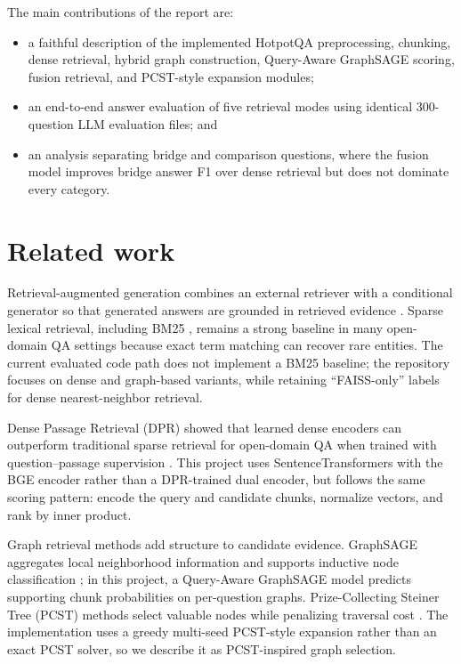 \documentclass{article}
\begin{document}
The main contributions of the report are:
\begin{itemize}
  \item a faithful description of the implemented HotpotQA preprocessing, chunking, dense retrieval, hybrid graph construction, Query-Aware GraphSAGE scoring, fusion retrieval, and PCST-style expansion modules;
  \item an end-to-end answer evaluation of five retrieval modes using identical 300-question LLM evaluation files; and
  \item an analysis separating bridge and comparison questions, where the fusion model improves bridge answer F1 over dense retrieval but does not dominate every category.
\end{itemize}

\section{Related work}

Retrieval-augmented generation combines an external retriever with a conditional generator so that generated answers are grounded in retrieved evidence \citep{lewis2020rag}. Sparse lexical retrieval, including BM25 \citep{robertson2009probabilistic}, remains a strong baseline in many open-domain QA settings because exact term matching can recover rare entities. The current evaluated code path does not implement a BM25 baseline; the repository focuses on dense and graph-based variants, while retaining ``FAISS-only'' labels for dense nearest-neighbor retrieval.

Dense Passage Retrieval (DPR) showed that learned dense encoders can outperform traditional sparse retrieval for open-domain QA when trained with question--passage supervision \citep{karpukhin2020dpr}. This project uses SentenceTransformers with the BGE encoder rather than a DPR-trained dual encoder, but follows the same scoring pattern: encode the query and candidate chunks, normalize vectors, and rank by inner product.

Graph retrieval methods add structure to candidate evidence. GraphSAGE aggregates local neighborhood information and supports inductive node classification \citep{hamilton2017graphsage}; in this project, a Query-Aware GraphSAGE model predicts supporting chunk probabilities on per-question graphs. Prize-Collecting Steiner Tree (PCST) methods select valuable nodes while penalizing traversal cost \citep{goemans1995pcst}. The implementation uses a greedy multi-seed PCST-style expansion rather than an exact PCST solver, so we describe it as PCST-inspired graph selection.
\end{document}
